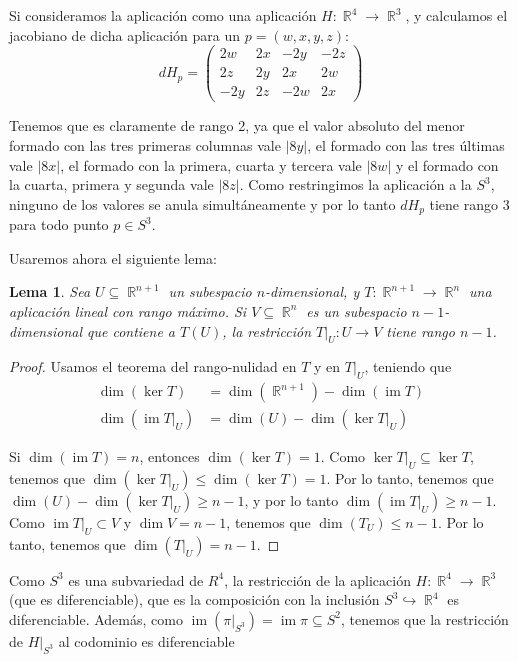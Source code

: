 \documentclass[11pt]{diazessay} %
\newtheorem{lemma}{Lema}
\DeclareMathOperator{\R}{\mathbb{R}}
\DeclareMathOperator{\im}{\textrm{im}}
\begin{document}
Si consideramos la aplicación como una aplicación $H:\R^4\to \R^3$, y calculamos el jacobiano de dicha aplicación para un $p=(w,x,y,z)$:
\[
    dH_{p}=\begin{pmatrix}
        2w  & 2x & -2y & -2z \\
        2z  & 2y & 2x  & 2w  \\
        -2y & 2z & -2w & 2x
    \end{pmatrix}
\]

Tenemos que es claramente de rango 2, ya que el valor absoluto del menor formado con las tres primeras columnas vale $|8y|$, el formado con las tres últimas vale $|8x|$, el formado con la primera, cuarta y tercera vale $|8w|$ y el formado con la cuarta, primera y segunda vale $|8z|$. Como restringimos la aplicación a la $S^3$, ninguno de los valores se anula simultáneamente y por lo tanto $dH_p$ tiene rango 3 para todo punto $p\in S^3$.

Usaremos ahora el siguiente lema:

\begin{lemma}
    Sea $U\subseteq \R^{n+1}$ un subespacio $n$-dimensional, y $T:\R^{n+1}\to\R^n$ una aplicación lineal con rango máximo. Si $V\subseteq \R^n$ es un subespacio $n-1$-dimensional que contiene a $T(U)$, la restricción $T|_U:U\to V$ tiene rango $n-1$.
\end{lemma}
\begin{proof}
    Usamos el teorema del rango-nulidad en $T$ y en $T|_U$, teniendo que
    \begin{align*}
        \dim(\ker T)   & = \dim(\R^{n+1}) - \dim(\im T) \\
        \dim(\im T|_U) & = \dim(U) - \dim(\ker T|_U)
    \end{align*}

    Si $\dim(\im T)=n$, entonces $\dim(\ker T)=1$. Como $\ker T|_U\subseteq \ker T$, tenemos que $\dim(\ker T|_U)\leq \dim(\ker T)=1$. Por lo tanto, tenemos que $\dim(U)-\dim(\ker T|_U) \geq n-1$, y por lo tanto $\dim(\im T|_U)\geq n-1$. Como $\im T|_U\subset V$ y $\dim V = n-1$, tenemos que $\dim(T_U)\leq n-1$. Por lo tanto, tenemos que $\dim(T|_U)=n-1$.
\end{proof}

Como $S^3$ es una subvariedad de $R^4$, la restricción de la aplicación $H:\R^4\to \R^3$ (que es diferenciable), que es la composición con la inclusión $S^3\hookrightarrow\R^4$ es diferenciable. Además, como $\im(\pi|_{S^3})=\im\pi\subseteq S^2$, tenemos que la restricción de $H|_{S^3}$ al codominio es diferenciable \cite[Corolario 1.29]{Oneill_1983}
\end{document}
